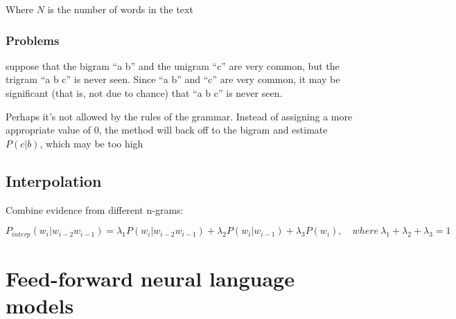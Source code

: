 \documentclass[11pt]{article}
\begin{document}
Where $N$ is the number of words in the text

\subsubsection{Problems}

suppose that the bigram ``a b'' and the unigram ``c'' are very common, but the trigram ``a b c'' is never seen. Since ``a b'' and ``c'' are very common, it may be significant (that is, not due to chance) that ``a b c'' is never seen.

Perhaps it's not allowed by the rules of the grammar.  Instead of assigning a more appropriate value of 0, the method will back off to the bigram and estimate $P(c | b)$, which may be too high

\subsection{Interpolation}

Combine evidence from different n-grams:

\begin{definition}[Interpolation]
    \begin{equation*}
        P_{interp}(w_i|w_{i-2}w_{i-1})=\lambda_1 P(w_i|w_{i-2} w_{i-1}) + \lambda_2 P(w_i|w_{i-1}) + \lambda_3 P(w_i), \quad where\ \lambda_1 + \lambda_2 + \lambda_3 = 1
    \end{equation*}
\end{definition}

\section{Feed-forward neural language models}
\end{document}
